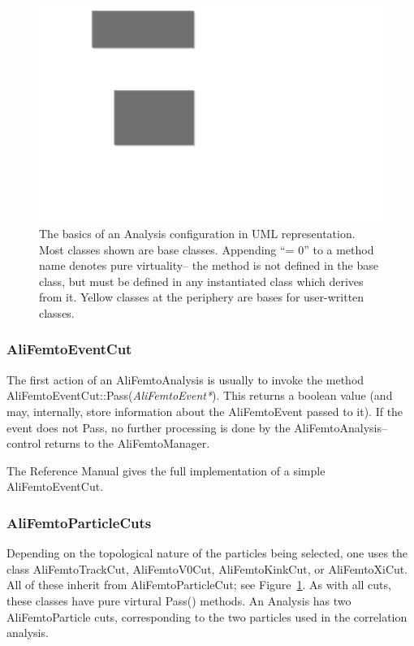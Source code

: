 \documentclass[twoside]{article}
\newcommand{\name}[1]{\textsf{#1}}%
\newcommand{\args}[1]{\textit{#1}}%
\newcommand{\meth}[1]{\textsf{#1}}%
\begin{document}
\begin{figure}[t]
\includegraphics[width=\textwidth]{Analysis.pdf}
\caption{The basics of an Analysis configuration in UML representation.  Most classes shown are base classes.
Appending ``= 0'' to a method name denotes pure virtuality-- the method is not defined in the base class, but must
be defined in any instantiated class which derives from it.  Yellow classes at the periphery are bases for user-written
classes.\label{fig:analysisUML}
}
\end{figure}

\subsubsection{AliFemtoEventCut}

The first action of an \name{AliFemtoAnalysis} is usually to invoke the method \name{AliFemtoEventCut::{\meth Pass(\args{AliFemtoEvent*})}}.
This returns
a boolean value (and may, internally, store information about the \name{AliFemtoEvent} passed to it).  If the event does not
Pass, no further processing is done by the AliFemtoAnalysis-- control returns to the \name{AliFemtoManager}.

The Reference Manual gives the full implementation of a simple \name{AliFemtoEventCut}.


\subsubsection{AliFemtoParticleCuts}
\label{sec:AliFemtoParticleCuts}

Depending on the topological nature of the particles being selected,
one uses the class \name{AliFemtoTrackCut}, \name{AliFemtoV0Cut}, \name{AliFemtoKinkCut}, or \name{AliFemtoXiCut}.
All of these inherit from \name{AliFemtoParticleCut};
see Figure~\ref{fig:analysisUML}.  As with all cuts, these classes have pure virtural \meth{Pass()} methods.
An Analysis has two \name{AliFemtoParticle} cuts, corresponding to the two particles used in the correlation analysis.
\end{document}

